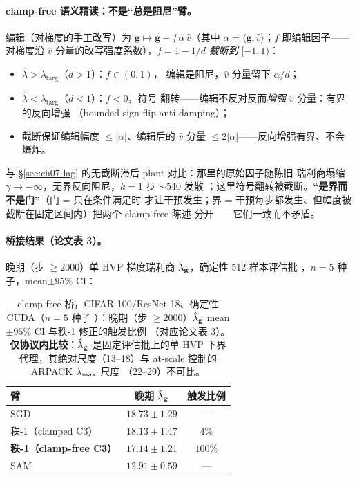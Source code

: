 \paragraph{clamp-free 语义精读：不是``总是阻尼''臂。}
编辑（对梯度的手工改写）为 $\mathbf{g}\mapsto\mathbf{g}-f\,\alpha\,\hat v$（其中
$\alpha=\langle\mathbf{g},\hat v\rangle$；$f$ 即编辑因子——对梯度沿
$\hat v$ 分量的改写强度系数），$f=1-1/d$ \emph{截断到}
$[-1,1)$：
\begin{itemize}
  \item $\hat\lambda>\lambda_{\mathrm{targ}}$（$d>1$）：$f\in(0,1)$，
        编辑是阻尼，$\hat v$ 分量留下 $\alpha/d$；
  \item $\hat\lambda<\lambda_{\mathrm{targ}}$（$d<1$）：$f<0$，符号
        翻转——编辑不反对反而\emph{增强} $\hat v$ 分量：有界的反向增强
        （bounded sign-flip anti-damping）；
  \item 截断保证编辑幅度 $\le|\alpha|$、编辑后的 $\hat v$ 分量
        $\le2|\alpha|$——反向增强有界、不会爆炸。
\end{itemize}
与 §\ref{sec:ch07-lag} 的无截断滞后 plant 对比：那里的原始因子随陈旧
瑞利商塌缩 $\gamma\to-\infty$，无界反向阻尼，$k{=}1$ 步 $\sim540$ 发散
；这里符号翻转被截断。\textbf{``是界而不是门''}（门 = 只在条件满足时
才让干预发生；界 = 干预每步都发生、但幅度被截断在固定区间内）把两个
clamp-free 陈述
分开——它们一致而不矛盾。

\paragraph{桥接结果（论文表 3）。}
晚期（步 $\geq2000$）单 HVP 梯度瑞利商 $\hat{\lambda}_{\mathbf{g}}$，确定性 512 样本评估批
，$n{=}5$ 种子，mean$\pm95\%$ CI：

\begin{table}[!ht]
\centering\small
\caption{clamp-free 桥，CIFAR-100/ResNet-18、确定性 CUDA（$n{=}5$ 种子
）：晚期（步 $\geq2000$）$\hat{\lambda}_{\mathbf{g}}$ mean$\pm95\%$ CI 与秩-1 修正的触发比例
（对应论文表 3）。\textbf{仅协议内比较}：$\hat{\lambda}_{\mathbf{g}}$ 是固定评估批上的单 HVP
下界代理，其绝对尺度（13--18）与 at-scale 控制的 ARPACK $\lambda_{\max}$ 尺度
（22--29）不可比。}
\label{tab:ch07-bridge}
\begin{tabular}{lcc}
\toprule
臂 & 晚期 $\hat{\lambda}_{\mathbf{g}}$ & 触发比例 \\
\midrule
SGD & $18.73\pm1.29$ & --- \\
秩-1（clamped C3） & $18.13\pm1.47$ & $4\%$ \\
\textbf{秩-1（clamp-free C3）} & $\mathbf{17.14\pm1.21}$ & $100\%$ \\
SAM & $12.91\pm0.59$ & --- \\
\bottomrule
\end{tabular}
\end{table}

